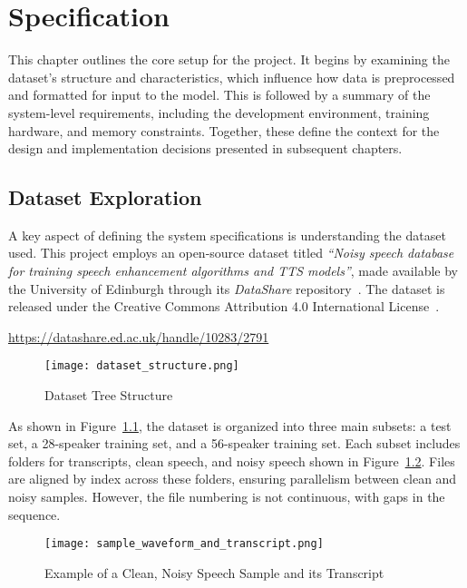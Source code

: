 \graphicspath{{content/chapters/4_specification/figures/}}
\chapter{Specification}
\label{chp:specification}

This chapter outlines the core setup for the project. It begins by examining the dataset’s structure and characteristics, which influence how data is preprocessed and formatted for input to the model. This is followed by a summary of the system-level requirements, including the development environment, training hardware, and memory constraints. Together, these define the context for the design and implementation decisions presented in subsequent chapters.

\section{Dataset Exploration}
\label{sec:dataset_exploration}

A key aspect of defining the system specifications is understanding the dataset used. This project employs an open-source dataset titled \textit{“Noisy speech database for training speech enhancement algorithms and TTS models”}, made available by the University of Edinburgh through its \textit{DataShare} repository~\cite{edinburghdataset}. The dataset is released under the Creative Commons Attribution 4.0 International License~\cite{ccby4}.

\url{https://datashare.ed.ac.uk/handle/10283/2791}

\begin{figure}[H]
    \centering
    \texttt{[image: dataset\_structure.png]}
    \caption{Dataset Tree Structure}
    \label{fig:dataset_structure}
\end{figure}

As shown in Figure~\ref{fig:dataset_structure}, the dataset is organized into three main subsets: a test set, a 28-speaker training set, and a 56-speaker training set. Each subset includes folders for transcripts, clean speech, and noisy speech shown in Figure~\ref{fig:sample_waveform_and_transcript}. Files are aligned by index across these folders, ensuring parallelism between clean and noisy samples. However, the file numbering is not continuous, with gaps in the sequence.

\begin{figure}[H]
    \centering
    \texttt{[image: sample\_waveform\_and\_transcript.png]}
    \caption{Example of a Clean, Noisy Speech Sample and its Transcript}
    \label{fig:sample_waveform_and_transcript}
\end{figure}


